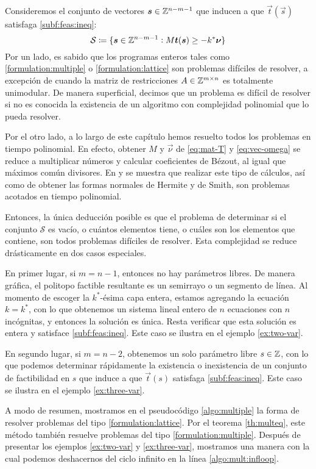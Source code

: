 Consideremos el conjunto de vectores $\boldsymbol{s} \in \mathbb{Z}^{n-m-1}$ que inducen a que $\vec{t}(\vec{s})$
satisfaga \eqref{subf:feas:ineq}:
\begin{equation*}
	\mathcal{S} \coloneq \lbrace \boldsymbol{s} \in \mathbb{Z}^{n-m-1} \vcentcolon M\boldsymbol{t}(\boldsymbol{s}) \geq -k^*\boldsymbol{\nu} \rbrace
\end{equation*}
Por un lado, es sabido que los programas enteros tales como \eqref{formulation:multiple} o
\eqref{formulation:lattice} son problemas difíciles de resolver, a excepción de cuando la matriz de
restricciones $A \in \mathbb{Z}^{m \times n}$ es totalmente unimodular. De manera superficial, decimos que
un problema es difícil de resolver si no es conocida la existencia de un algoritmo con complejidad
polinomial que lo pueda resolver.

Por el otro lado, a lo largo de este capítulo hemos resuelto todos los problemas en tiempo
polinomial. En efecto, obtener $M$ y $\vec{\nu}$ de \eqref{eq:mat-T} y \eqref{eq:vec-omega} se
reduce a multiplicar números y calcular coeficientes de Bézout, al igual que máximos común
divisores. En \cite{alex} y \cite{morris} se muestra que realizar este tipo de cálculos, así como de
obtener las formas normales de Hermite y de Smith, son problemas acotados en tiempo polinomial.

Entonces, la única deducción posible es que el problema de determinar si el conjunto $\mathcal{S}$
es vacío, o cuántos elementos tiene, o cuáles son los elementos que contiene, son todos problemas
difíciles de resolver. Esta complejidad se reduce drásticamente en dos casos especiales.

En primer lugar, si $m = n - 1$, entonces no hay parámetros libres. De manera gráfica, el politopo
factible resultante es un semirrayo o un segmento de línea. Al momento de escoger la $k^*$-ésima
capa entera, estamos agregando la ecuación $k = k^*$, con lo que obtenemos un sistema lineal entero
de $n$ ecuaciones con $n$ incógnitas, y entonces la solución es única. Resta verificar que esta
solución es entera y satisface \eqref{subf:feas:ineq}. Este caso se ilustra en el ejemplo
\ref{ex:two-var}.

En segundo lugar, si $m = n - 2$, obtenemos un solo parámetro libre $s \in \mathbb{Z}$, con lo que podemos
determinar rápidamente la existencia o inexistencia de un conjunto de factibilidad en $s$ que induce
a que $\vec{t}(s)$ satisfaga \eqref{subf:feas:ineq}. Este caso se ilustra en el ejemplo
\ref{ex:three-var}.

A modo de resumen, mostramos en el pseudocódigo \ref{algo:multiple} la forma de resolver problemas
del tipo \eqref{formulation:lattice}. Por el teorema \ref{th:multeq}, este método también resuelve
problemas del tipo \eqref{formulation:multiple}. Después de presentar los ejemplos \ref{ex:two-var}
y \ref{ex:three-var}, mostramos una manera con la cual podemos deshacernos del ciclo infinito en la
línea \ref{algo:mult:infloop}.

